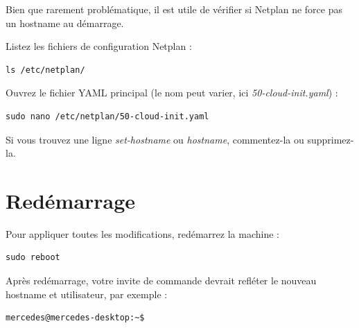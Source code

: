 Bien que rarement problématique, il est utile de vérifier si Netplan ne force pas un hostname au démarrage.

Listez les fichiers de configuration Netplan :

\begin{lstlisting}[style=commandstyle]
ls /etc/netplan/
\end{lstlisting}

Ouvrez le fichier YAML principal (le nom peut varier, ici \textit{50-cloud-init.yaml}) :

\begin{lstlisting}[style=commandstyle]
sudo nano /etc/netplan/50-cloud-init.yaml
\end{lstlisting}

Si vous trouvez une ligne \textit{set-hostname} ou \textit{hostname}, commentez-la ou supprimez-la.



\section{Redémarrage}

Pour appliquer toutes les modifications, redémarrez la machine :

\begin{lstlisting}[style=commandstyle]
sudo reboot
\end{lstlisting}

Après redémarrage, votre invite de commande devrait refléter le nouveau hostname et utilisateur, par exemple :

\begin{lstlisting}[style=commandstyle]
mercedes@mercedes-desktop:~$
\end{lstlisting}

